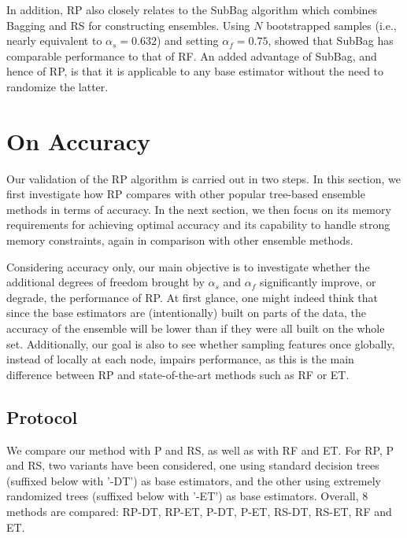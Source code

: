 In addition, RP also closely relates to the SubBag algorithm
which combines Bagging and RS for constructing ensembles. Using $N$
bootstrapped samples (i.e., nearly equivalent to $\alpha_s=0.632$) and setting
$\alpha_f=0.75$, \citet{panov:2007} showed that SubBag has comparable performance to that of
RF. An added advantage of SubBag, and hence of RP, is that it is applicable to
any base estimator without the need to randomize the latter.


\section{On Accuracy}
\label{sec:9:accuracy}

Our validation of the RP algorithm is carried out in two
steps. In this section, we first investigate how RP compares with
other popular tree-based ensemble methods in terms of accuracy. In the
next section, we then focus on its memory requirements for
achieving optimal accuracy and its capability to handle strong memory
constraints, again in comparison with other ensemble methods.

Considering accuracy only, our main objective is to investigate whether the
additional degrees of freedom brought by $\alpha_s$ and $\alpha_f$ significantly improve,
or degrade, the performance of RP. At first glance, one might indeed think that
since the base estimators are (intentionally) built on parts of the data, the
accuracy of the ensemble will be lower than if they were all built on the whole
set. Additionally, our goal is also to see whether sampling features once
globally, instead of locally at each node, impairs performance, as this is the
main difference between RP and state-of-the-art methods such as RF or ET.

\subsection{Protocol}

We compare our method with P and RS, as well as with RF and ET. For RP, P and
RS, two variants have been considered, one using standard decision trees
(suffixed below with '-DT') as base estimators, and the other using extremely
randomized trees (suffixed below with '-ET') as base estimators.  Overall, 8
methods are compared: RP-DT, RP-ET, P-DT, P-ET, RS-DT, RS-ET, RF and ET.

